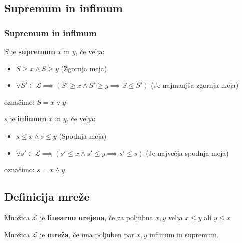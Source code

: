 \documentclass[slovene]{beamer}
\begin{document}
\begin{frame}
\subsection{Supremum in infimum}
\frametitle{Supremum in infimum}

\begin{definition}
$S$ je \textbf{supremum} $x$ in $y$, če velja: 
\begin{itemize}
\item $S \geq x \land S \geq y$ (Zgornja meja)
\item $\forall S' \in \mathcal{L} \implies (S' \geq x \land S' \geq y \implies S \leq S')$ (Je najmanjša zgornja meja)
\end{itemize}
označimo: $S = x \lor y$ 
\end{definition}

\pause
\begin{definition}
$s$ je \textbf{infimum} $x$ in $y$, če velja: 
\begin{itemize}
\item $s \leq x \land s \leq y$ (Spodnja meja)
\item $\forall s' \in \mathcal{L} \implies (s' \leq x \land s' \leq y \implies s' \leq s)$ (Je največja spodnja meja)
\end{itemize}
označimo: $s = x \land y$ 
\end{definition}

\end{frame}

\begin{frame}
\subsection{Definicija mreže}
\begin{definition}
Množica $\mathcal{L}$ je \textbf{linearno urejena}, če za poljubna $x,y$ velja $x \leq y$ ali  $y \leq x$ 
\end{definition}
\pause
\begin{definition}
Množica $\mathcal{L}$ je \textbf{mreža}, če ima poljuben par $x,y$ infimum in supremum.
\end{definition}

\end{frame}
\end{document}
